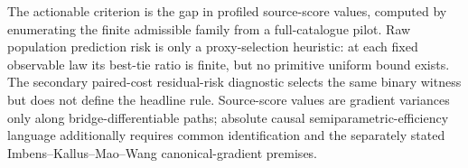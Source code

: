 The actionable criterion is the gap in profiled source-score values, computed by enumerating the finite admissible family from a full-catalogue pilot. Raw population prediction risk is only a proxy-selection heuristic: at each fixed observable law its best-tie ratio is finite, but no primitive uniform bound exists. The secondary paired-cost residual-risk diagnostic selects the same binary witness but does not define the headline rule. Source-score values are gradient variances only along bridge-differentiable paths; absolute causal semiparametric-efficiency language additionally requires common identification and the separately stated Imbens--Kallus--Mao--Wang canonical-gradient premises.